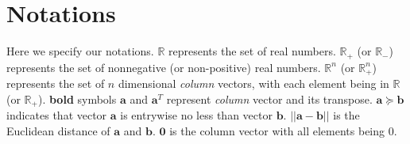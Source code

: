 \documentclass[journal]{IEEEtran}
\newcommand{\bv}[1]{{\boldsymbol{#1} }}
\begin{document}


 
\section{Notations}\label{section:notation}
Here we specify our notations. $\mathbb{R}$ represents the set of real numbers. $\mathbb{R}_+$ (or $\mathbb{R}_-$) represents the set of nonnegative (or non-positive) real numbers. $\mathbb{R}^n$ (or $\mathbb{R}^n_+$) represents the set of $n$ dimensional \emph{column} vectors, with each element being in $\mathbb{R}$ (or $\mathbb{R}_+$).  \textbf{bold} symbols $\bv{a}$ and $\bv{a}^T$ represent \emph{column} vector and its transpose. $\bv{a}\succeq\bv{b}$ indicates that vector $\bv{a}$ is entrywise no less than vector $\bv{b}$. $||\bv{a}-\bv{b}||$ is the Euclidean distance of $\bv{a}$ and $\bv{b}$. $\bv{0}$ is the column vector with all elements being $0$. 



\end{document}
